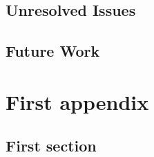 \documentclass[logo,msc]{infthesis}           %
\begin{document}
\section{Unresolved Issues}

\section{Future Work}





\appendix

\chapter{First appendix}

\section{First section}
\end{document}
